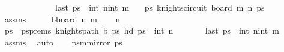 \begin{isabellebody}
\ \ \ \ \ \ \ \ \ \ \ \ {\isasymand}\ last\ ps\ {\isacharequal}{\kern0pt}\ {\isacharparenleft}{\kern0pt}int\ {\isacharparenleft}{\kern0pt}n{\isacharminus}{\kern0pt}{}{\isacharparenright}{\kern0pt}{\isacharminus}{\kern0pt}{}{\isacharcomma}{\kern0pt}int\ m{\isacharminus}{\kern0pt}{}{\isacharparenright}{\kern0pt}{\isachardoublequoteclose}\isanewline
\ \ \ {\isachardoublequoteopen}{\isasymexists}ps{\isachardot}{\kern0pt}\ knights{\isacharunderscore}{\kern0pt}circuit\ {\isacharparenleft}{\kern0pt}board\ m\ n{\isacharparenright}{\kern0pt}\ ps{\isachardoublequoteclose}\isanewline
%
\isadelimproof
\ \ %
\endisadelimproof
%
\isatagproof
{}\isamarkupfalse%
\ assms\isanewline
{}\isamarkupfalse%
\ {\isacharminus}{\kern0pt}\isanewline
\ \ \isamarkupfalse%
\ {\isacharquery}{\kern0pt}bboard\ {\isacharparenleft}{\kern0pt}n{\isacharminus}{\kern0pt}{}{\isacharparenright}{\kern0pt}\ m{\isachardoublequoteclose}\isanewline
\ \ \isamarkupfalse%
\ {\isachardoublequoteopen}n\ {\isasymge}\ {}{}{\isachardoublequoteclose}\isanewline
\ \ \isamarkupfalse%
\ \isamarkupfalse%
\ ps\ \ psprems{\isacharcolon}{\kern0pt}\ {\isachardoublequoteopen}knights{\isacharunderscore}{\kern0pt}path\ {\isacharquery}{\kern0pt}b\ ps\ {\isachardoublequoteopen}hd\ ps\ {\isacharequal}{\kern0pt}\ {\isacharparenleft}{\kern0pt}int\ {\isacharparenleft}{\kern0pt}n{\isacharminus}{\kern0pt}{}{\isacharparenright}{\kern0pt}{\isacharcomma}{\kern0pt}{}{\isacharparenright}{\kern0pt}{\isachardoublequoteclose}\ \isanewline
\ \ \ \ \ \ {\isachardoublequoteopen}last\ ps\ {\isacharequal}{\kern0pt}\ {\isacharparenleft}{\kern0pt}int\ {\isacharparenleft}{\kern0pt}n{\isacharminus}{\kern0pt}{}{\isacharparenright}{\kern0pt}{\isacharminus}{\kern0pt}{}{\isacharcomma}{\kern0pt}int\ m{\isacharminus}{\kern0pt}{}{\isacharparenright}{\kern0pt}{\isachardoublequoteclose}\isanewline
\ \ \ \ \isamarkupfalse%
\ assms\ \isamarkupfalse%
\ auto\isanewline
\ \ \isamarkupfalse%
\ {\isacharquery}{\kern0pt}psm{}{\isacharequal}{\kern0pt}{\isachardoublequoteopen}mirror{}\ ps\isanewline

\end{isabellebody}
